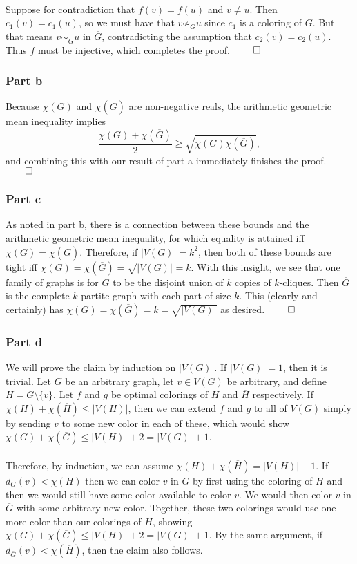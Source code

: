 \documentclass[10pt,a4paper]{article}
\newcommand{\1}{\mathbf{1}}
\begin{document}
\paragraph*{}Suppose for contradiction that $f(v) = f(u)$ and $v \neq u$.  Then $c_1 (v) = c_1 (u)$, so we must have that $v \not \sim_{G} u$ since $c_1$ is a coloring of $G$.  But that means $v \sim_{\overline{G}} u$ in $\overline{G}$, contradicting the assumption that $c_2 (v) = c_2 (u)$.  Thus $f$ must be injective, which completes the proof. $\qed$

\subsubsection*{Part b}
Because $\chi(G)$ and $\chi(\overline{G})$ are non-negative reals, the arithmetic geometric mean inequality implies
\[
\dfrac{\chi(G) + \chi(\overline{G})}{2} \geq \sqrt{\chi(G)\chi(\overline{G})},
\]
and combining this with our result of part a immediately finishes the proof. $\qed$

\subsubsection*{Part c}
As noted in part b, there is a connection between these bounds and the arithmetic geometric mean inequality, for which equality is attained iff $\chi(G) = \chi(\overline{G})$.  Therefore, if $|V(G)| = k^2$, then both of these bounds are tight iff $\chi(G) = \chi(\overline{G}) = \sqrt{|V(G)|} = k$.  With this insight, we see that one family of graphs is for $G$ to be the disjoint union of $k$ copies of $k$-cliques.  Then $\overline{G}$ is the complete $k$-partite graph with each part of size $k$.  This (clearly and certainly) has $\chi(G) = \chi(\overline{G}) = k = \sqrt{|V(G)|}$ as desired. $\qed$

\subsubsection*{Part d}
We will prove the claim by induction on $|V(G)|$.  If $|V(G)| = 1$, then it is trivial.  Let $G$ be an arbitrary graph, let $v \in V(G)$ be arbitrary, and define $H = G\setminus \{v\}$.  Let $f$ and $g$ be optimal colorings of $H$ and $\overline{H}$ respectively.  If $\chi(H) + \chi(\overline{H}) \leq |V(H)|$, then we can extend $f$ and $g$ to all of $V(G)$ simply by sending $v$ to some new color in each of these, which would show $\chi(G) + \chi(\overline{G}) \leq |V(H)| + 2 = |V(G)| + 1$.
\paragraph*{}Therefore, by induction, we can assume $\chi(H) + \chi(\overline{H}) = |V(H)| + 1$.  If $d_{G} (v) < \chi(H)$ then we can color $v$ in $G$ by first using the coloring of $H$ and then we would still have some color available to color $v$.  We would then color $v$ in $\overline{G}$ with some arbitrary new color.  Together, these two colorings would use one more color than our colorings of $H$, showing $\chi(G) + \chi(\overline{G}) \leq |V(H)| + 2 = |V(G)| + 1$.  By the same argument, if $d_{\overline{G}} (v) < \chi(\overline{H})$, then the claim also follows.
\end{document}
